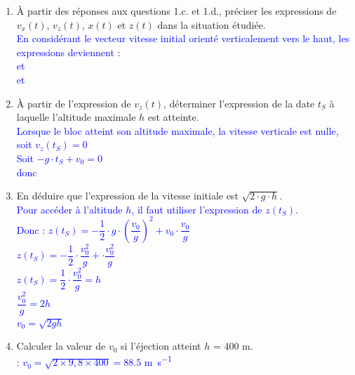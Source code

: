 \documentclass[a4paper,12pt]{article}
\begin{document}
\begin{enumerate}
\begin{enumerate}
		\item À partir des réponses aux questions 1.c. et 1.d., préciser les expressions de $v_x(t)$, $v_z(t)$, $x(t)$ et $z(t)$ dans la situation étudiée.\\
		\textcolor{blue}{En considérant le vecteur vitesse initial orienté verticalement vers le haut, les expressions deviennent :\\
		 et \\
		 et 
		}
		\item À partir de l'expression de $v_z(t)$, déterminer l'expression de la date $t_S$ à laquelle l'altitude maximale $h$ est atteinte.\\
		\textcolor{blue}{Lorsque le bloc atteint son altitude maximale, la vitesse verticale est nulle, soit $v_z(t_S)=0$\\
		Soit $-g\cdot t_S + v_0 = 0$\\
		donc }
		\item En déduire que l'expression de la vitesse initiale est $\sqrt{2 \cdot g \cdot h}$.\\
		\textcolor{blue}{Pour accéder à l'altitude $h$, il faut utiliser l'expression de $z(t_S)$.\\ Donc : $z(t_S) = -\dfrac{1}{2} \cdot g \cdot (\dfrac{v_0}{g})^2 + v_0 \cdot \dfrac{v_0}{g}$\\
		$z(t_S) = -\dfrac{1}{2} \cdot \dfrac{v_0^2}{g} + \cdot \dfrac{v_0^2}{g}$\\
		$z(t_S) = \dfrac{1}{2} \cdot \dfrac{v_0^2}{g} = h$\\
		$\dfrac{v_0^2}{g} = 2h$\\
		$v_0 = \sqrt{2gh}$}
		\item Calculer la valeur de $v_0$ si l'éjection atteint $h$ = \num{400} \unit{\meter}.\\
		\textcolor{blue}{ : $v_0 = \sqrt{2 \times 9,8 \times 400} = \num{88,5}$ \unit{\meter\per\second}}
	\end{enumerate}
\end{enumerate}
\end{document}

